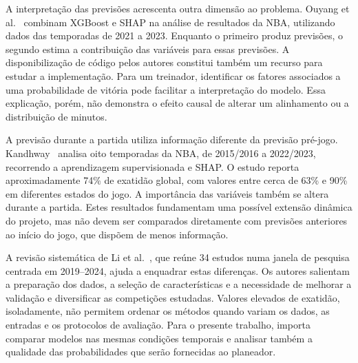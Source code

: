 A interpretação das previsões acrescenta outra dimensão ao problema.
Ouyang et al.~\cite{ouyang2024} combinam XGBoost e SHAP na análise de
resultados da NBA, utilizando dados das temporadas de 2021 a 2023.
Enquanto o primeiro produz previsões, o segundo estima a contribuição
das variáveis para essas previsões. A disponibilização de código pelos
autores constitui também um recurso para estudar a implementação.
Para um treinador, identificar os fatores associados a uma probabilidade
de vitória pode facilitar a interpretação do modelo. Essa explicação,
porém, não demonstra o efeito causal de alterar um alinhamento ou a
distribuição de minutos.

A previsão durante a partida utiliza informação diferente da previsão
pré-jogo. Kandhway~\cite{kandhway2025} analisa oito temporadas da NBA,
de 2015/2016 a 2022/2023, recorrendo a aprendizagem supervisionada e SHAP.
O estudo reporta aproximadamente 74\% de exatidão global, com valores
entre cerca de 63\% e 90\% em diferentes estados do jogo. A importância
das variáveis também se altera durante a partida. Estes resultados
fundamentam uma possível extensão dinâmica do projeto, mas não devem
ser comparados diretamente com previsões anteriores ao início do jogo,
que dispõem de menos informação.

A revisão sistemática de Li et al.~\cite{li2025}, que reúne 34 estudos
numa janela de pesquisa centrada em 2019--2024, ajuda a enquadrar estas
diferenças. Os autores salientam a preparação dos dados, a seleção de
características e a necessidade de melhorar a validação e diversificar
as competições estudadas. Valores elevados de exatidão, isoladamente,
não permitem ordenar os métodos quando variam os dados, as entradas e
os protocolos de avaliação. Para o presente trabalho, importa comparar
modelos nas mesmas condições temporais e analisar também a qualidade
das probabilidades que serão fornecidas ao planeador.
